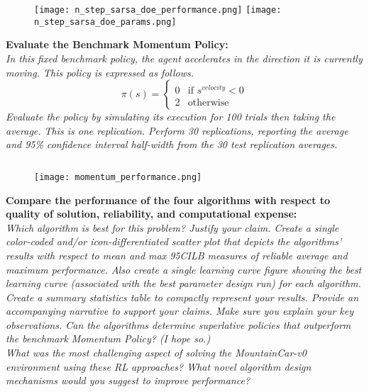 \documentclass[12pt,letterpaper]{exam}
\begin{document}
\begin{questions}
\begin{figure}[H]
    \texttt{[image: n\_step\_sarsa\_doe\_performance.png]}
    \texttt{[image: n\_step\_sarsa\_doe\_params.png]}
\end{figure}
{\footnotesize{}}


\question%
\textbf{Evaluate the Benchmark Momentum Policy:} \\
\emph{ 
In this fixed benchmark policy, the agent accelerates in the direction it is currently moving. 
This policy is expressed as follows.
\[\pi(s) = 
\begin{cases}
    0 & \text{if } s^{velocity} < 0 \\
    2 & \text{otherwise}
\end{cases}\]
Evaluate the policy by simulating its execution for 100 trials then taking the average. 
This is one replication. Perform 30 replications, reporting the average and 95\% 
confidence interval half-width from the 30 test replication averages.
}
\inputminted{python3}{scripts/benchmark_momentum.py}
\begin{figure}[H]
    \texttt{[image: momentum\_performance.png]}
\end{figure}


\question%
\textbf{Compare the performance of the four algorithms with respect to quality of solution, 
reliability, and computational expense:} \\
\emph{ 
Which algorithm is best for this problem? Justify your claim. 
Create a single color-coded and/or icon-differentiated scatter plot that depicts the algorithms' 
results with respect to mean and max 95CILB measures of reliable average and maximum performance. 
Also create a single learning curve figure showing the best learning curve 
(associated with the best parameter design run) for each algorithm. 
Create a summary statistics table to compactly represent your results. 
Provide an accompanying narrative to support your claims. 
Make sure you explain your key observations. Can the algorithms determine superlative policies 
that outperform the benchmark Momentum Policy? (I hope so.)
\\[0.25em]
What was the most challenging aspect of solving the MountainCar-v0 environment using these RL
approaches? What novel algorithm design mechanisms would you suggest to improve performance?
}


\end{questions}
\end{document}

